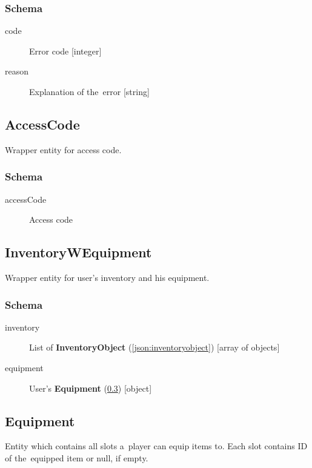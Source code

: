 		\subsubsection{Schema}
			\begin{description}
				\item[code] Error code [integer]
				\item[reason] Explanation of the~error [string]
			\end{description}

	\subsection{AccessCode}
		\label{json:accesscode}
		Wrapper entity for access code.
		\subsubsection{Schema}
			\begin{description}
				\item[accessCode] Access code
			\end{description}

	\subsection{InventoryWEquipment}
		\label{json:inventoryequipment}
		Wrapper entity for user's inventory and his equipment.		
		\subsubsection{Schema}
			\begin{description}
				\item[inventory] List of \textbf{InventoryObject} (\ref{json:inventoryobject}) [array of objects]
				\item[equipment] User's \textbf{Equipment} (\ref{json:equipment}) [object]
			\end{description}
	
	\subsection{Equipment}
		\label{json:equipment}
		Entity which contains all slots a~player can equip items to. Each slot contains ID of the~equipped item or null, if empty. 
